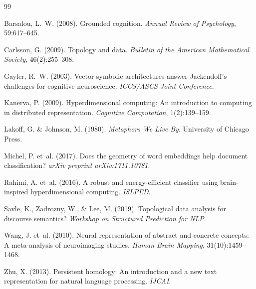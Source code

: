 \documentclass[11pt,a4paper]{article}
\begin{document}

\begin{thebibliography}{99}

Barsalou, L.~W. (2008).
\newblock Grounded cognition.
\newblock \textit{Annual Review of Psychology}, 59:617--645.

Carlsson, G. (2009).
\newblock Topology and data.
\newblock \textit{Bulletin of the American Mathematical Society}, 46(2):255--308.

Gayler, R.~W. (2003).
\newblock Vector symbolic architectures answer Jackendoff's challenges for cognitive neuroscience.
\newblock \textit{ICCS/ASCS Joint Conference}.

Kanerva, P. (2009).
\newblock Hyperdimensional computing: An introduction to computing in distributed representation.
\newblock \textit{Cognitive Computation}, 1(2):139--159.

Lakoff, G. \& Johnson, M. (1980).
\newblock \textit{Metaphors We Live By}.
\newblock University of Chicago Press.

Michel, P. et~al. (2017).
\newblock Does the geometry of word embeddings help document classification?
\newblock \textit{arXiv preprint arXiv:1711.10781}.

Rahimi, A. et~al. (2016).
\newblock A robust and energy-efficient classifier using brain-inspired hyperdimensional computing.
\newblock \textit{ISLPED}.

Savle, K., Zadrozny, W., \& Lee, M. (2019).
\newblock Topological data analysis for discourse semantics?
\newblock \textit{Workshop on Structured Prediction for NLP}.

Wang, J. et~al. (2010).
\newblock Neural representation of abstract and concrete concepts: A meta-analysis of neuroimaging studies.
\newblock \textit{Human Brain Mapping}, 31(10):1459--1468.

Zhu, X. (2013).
\newblock Persistent homology: An introduction and a new text representation for natural language processing.
\newblock \textit{IJCAI}.

\end{thebibliography}
\end{document}
